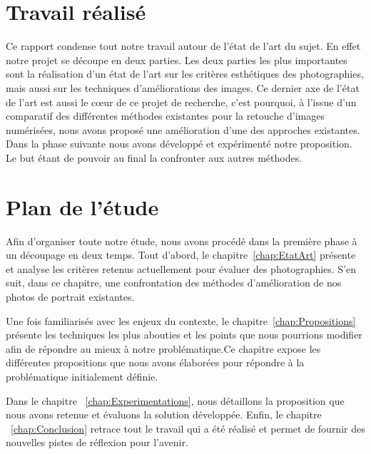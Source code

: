 \documentclass[11pt, french,screen]{report-rd-info}
\begin{document}
\section{Travail réalisé}
Ce rapport condense tout notre travail autour de l'état de l'art du sujet. En effet notre projet se découpe en deux parties. Les deux parties les plus importantes sont la réalisation d'un état de l'art sur les critères esthétiques des photographies, mais aussi sur les techniques d'améliorations des images. Ce dernier axe de l'état de l'art est aussi le cœur de ce projet de recherche, c'est pourquoi, à l'issue d'un comparatif des différentes méthodes existantes pour la retouche d'images numérisées, nous avons proposé une amélioration d'une des approches existantes.
Dans la phase suivante nous avons développé et expérimenté notre proposition. Le but étant de pouvoir au final la confronter aux autres méthodes.

 

\section{Plan de l'étude}
Afin d'organiser toute notre étude, nous avons procédé dans la première phase à un découpage en deux temps. Tout d'abord, le chapitre~\ref{chap:EtatArt} présente et analyse les critères retenus actuellement pour évaluer des photographies. S'en suit, dans ce chapitre, une confrontation des méthodes d'amélioration de nos photos de portrait existantes.

Une fois familiarisés avec les enjeux du contexte, le chapitre~\ref{chap:Propositions} présente les techniques les plus abouties et les points que nous pourrions modifier afin de répondre au mieux à notre problématique.Ce chapitre expose les différentes propositions que nous avons élaborées pour répondre à la problématique initialement définie.

Dans le chapitre ~\ref{chap:Experimentations}, nous détaillons la proposition que nous avons retenue et évaluons la solution développée.
Enfin, le chapitre ~\ref{chap:Conclusion} retrace tout le travail qui a été réalisé et permet de fournir des nouvelles pistes de réflexion pour l'avenir.

\end{document}
